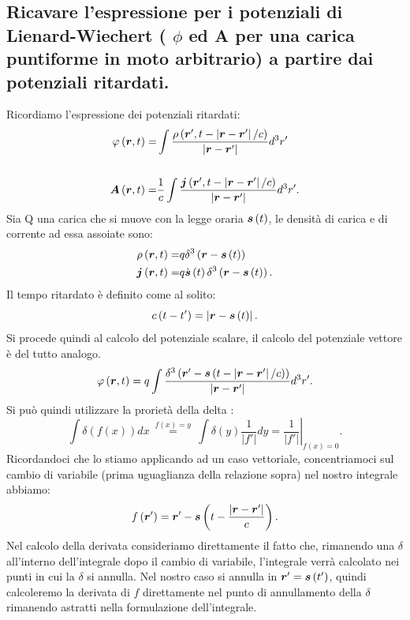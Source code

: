 \subsection[]{Ricavare l’espressione per i potenziali di Lienard-Wiechert ( $\phi$ ed A per una carica puntiforme in moto arbitrario) a partire dai potenziali ritardati.}
\label{sec:3.b.13}
Ricordiamo l'espressione dei potenziali ritardati:
\begin{align*}
	\varphi\left( \boldsymbol{r},t \right)=	& \int \frac{\rho\left( \boldsymbol{r}', t-\left| \boldsymbol{r}-\boldsymbol{r}' \right|/c \right) }{\left| \boldsymbol{r}-\boldsymbol{r}' \right| }d^3r'\\
					&\\
	\boldsymbol{A}\left( \boldsymbol{r},t \right)=	& \frac{1}{c}\int \frac{\boldsymbol{j}\left( \boldsymbol{r}', t-\left| \boldsymbol{r}-\boldsymbol{r}' \right|/c \right)}{\left| \boldsymbol{r}- \boldsymbol{r}' \right|} d^3r'
.\end{align*}
Sia Q una carica che si muove con la legge oraria $\boldsymbol{s}\left( t \right) $, le densità di carica e di corrente ad essa assoiate sono:
\begin{align*}
	\rho\left( \boldsymbol{r},t \right) =&q\delta^3\left( \boldsymbol{r}-\boldsymbol{s}\left( t \right) \right)\\
	\boldsymbol{j}\left( \boldsymbol{r},t \right) =&q \dot{\boldsymbol{s}}\left( t \right) \delta^3\left(\boldsymbol{r}-\boldsymbol{s}\left( t \right)   \right)
.\end{align*}
Il tempo ritardato è definito come al solito:
\[
	c\left( t- t' \right) = \left| \boldsymbol{r}-\boldsymbol{s}\left( t \right)  \right| 
.\] 
Si procede quindi al calcolo del potenziale scalare, il calcolo del potenziale vettore è del tutto analogo.
\[	
	\varphi\left( \boldsymbol{r},t \right)=	 q\int \frac{\delta^3\left( \boldsymbol{r}'-\boldsymbol{s}\left( t-\left| \boldsymbol{r}- \boldsymbol{r}' \right|/c \right)  \right)  }{\left| \boldsymbol{r}-\boldsymbol{r}' \right| }d^3r'\\
.\] 
Si può quindi utilizzare la prorietà della delta :
\[
	\int \delta\left( f\left( x \right)  \right) dx \ \stackrel{f\left( x \right) = y}{=} \ \int\delta\left( y \right) \frac{1}{\left| f' \right| }dy= \left. \frac{1}{\left| f' \right| }\right|_{f\left( x \right) =0}
.\] 
Ricordandoci che lo stiamo applicando ad un caso vettoriale, concentriamoci sul cambio di variabile (prima uguaglianza della relazione sopra) nel nostro integrale abbiamo:
\[
	f\left( \boldsymbol{r}' \right) = \boldsymbol{r}'- \boldsymbol{s}\left( t- \frac{\left| \boldsymbol{r}-\boldsymbol{r}' \right| }{c} \right) 
.\]
Nel calcolo della derivata consideriamo direttamente il fatto che, rimanendo una $\delta$ all'interno dell'integrale dopo il cambio di variabile, l'integrale verrà calcolato nei punti in cui la $\delta$ si annulla. Nel nostro caso si annulla in $\boldsymbol{r}' = \boldsymbol{s}\left( t' \right) $, quindi calcoleremo la derivata di $f$ direttamente nel punto di annullamento della $\delta$ rimanendo astratti nella formulazione dell'integrale. 

